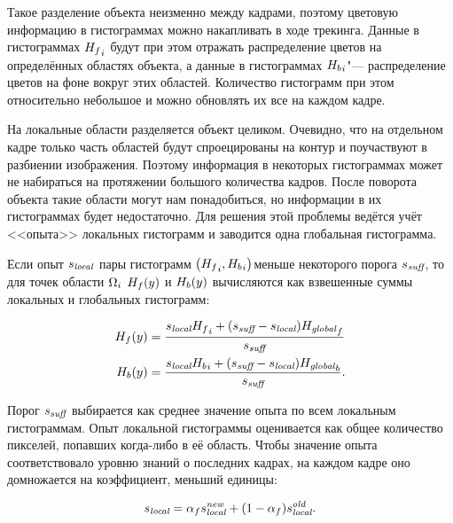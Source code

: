 Такое разделение объекта неизменно между кадрами, поэтому цветовую информацию
в гистограммах можно накапливать в ходе трекинга.
Данные в гистограммах ${H_f}_i$ будут при этом отражать распределение
цветов на определённых областях объекта, а данные в гистограммах
${H_b}_i$"--- распределение цветов на фоне вокруг этих областей.
Количество гистограмм при этом относительно небольшое и можно 
обновлять их все на каждом кадре.

На локальные области разделяется объект целиком. 
Очевидно, что на отдельном кадре только часть областей будут спроецированы на
контур и поучаствуют в разбиении изображения.
Поэтому информация в некоторых гистограммах может не набираться на протяжении
большого количества кадров.
После поворота объекта такие области могут нам понадобиться, но информации в
их гистограммах будет недостаточно.
Для решения этой проблемы ведётся учёт <<опыта>> локальных гистограмм и
заводится одна глобальная гистограмма.

Если опыт $s_{\text{\it local}}$ пары гистограмм $\left( {H_f}_i,
{H_b}_i \right)$меньше некоторого порога
$s_{\text{\it suff}}$, то для точек области $\Omega_i$ $H_f(y)$ и $H_b(y)$
вычисляются
как
взвешенные суммы локальных и глобальных гистограмм:

\begin{align}
\label{eqn:histo_skill}
H_f(y) &= \dfrac{s_{\text{\it local}} {H_f}_i + (s_{\text{\it suff}} -
s_{\text{\it local}})
        {H_{\text {\it global}}}_f}{s_{\text{\it suff}}} \\
H_b(y) &= \dfrac{s_{\text{\it local}} {H_b}_i + (s_{\text{\it suff}} -
s_{\text{\it local}})
        {H_{\text {\it global}}}_b}{s_{\text{\it suff}}}
\text{.}
\end{align}

Порог $s_{\text{\it suff}}$ выбирается как среднее значение опыта по всем
локальным
гистограммам.
Опыт локальной гистограммы оценивается как общее количество пикселей, попавших
когда-либо в её область.
Чтобы значение опыта соответствовало уровню знаний о последних кадрах, на
каждом кадре оно домножается на коэффициент, меньший единицы:

\begin{equation}
s_{\text{\it local}} = \alpha_f s_{\text{\it local}}^{\text{\it new}} + (1 -
\alpha_f) s_{\text{\it local}}^{\text{\it old}}
\text{.}
\end{equation}


